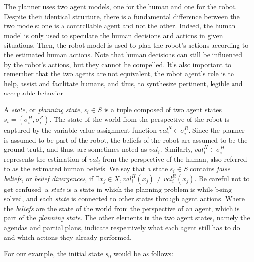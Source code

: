 The planner uses two agent models, one for the human and one for the robot. Despite their identical structure, there is a fundamental difference between the two models: one is a controllable agent and not the other. Indeed, the human model is only used to speculate the human decisions and actions in given situations. 
Then, the robot model is used to plan the robot's actions according to the estimated human actions.
Note that human decisions can still be influenced by the robot's actions, but they cannot be compelled.
It's also important to remember that the two agents are not equivalent, the robot agent's role is to help, assist and facilitate humans, and thus, to synthesize pertinent, legible and acceptable behavior.


A \textit{state}, or \textit{planning state}, $s_i \in S$ is a tuple composed of two agent states $s_i = ( \sigma^{H}_i, \sigma^{R}_i )$.
The state of the world from the perspective of the robot is captured by the variable value assignment function $val^R_i \in \sigma^{R}_i$. Since the planner is assumed to be part of the robot, the beliefs of the robot are assumed to be the ground truth, and thus, are sometimes noted as $val_i$. 
Similarly, $val^H_i \in \sigma^{H}_i$ represents the estimation of $val_i$ from the perspective of the human, also referred to as the estimated human beliefs.
We say that a state $s_i \in S$ contains \textit{false beliefs}, or \textit{belief divergences}, if $\exists x_j \in X, val^H_i(x_j) \neq val^R_i(x_j)$. 
Be careful not to get confused, a \textit{state} is a state in which the planning problem is while being solved, and each \textit{state} is connected to other states through agent actions. Where the \textit{beliefs} are the state of the world from the perspective of an agent, which is part of the \textit{planning state}.
The other elements in the two agent states, namely the agendas and partial plans, indicate respectively what each agent still has to do and which actions they already performed. 

For our example, the initial state $s_0$ would be as follows: 


